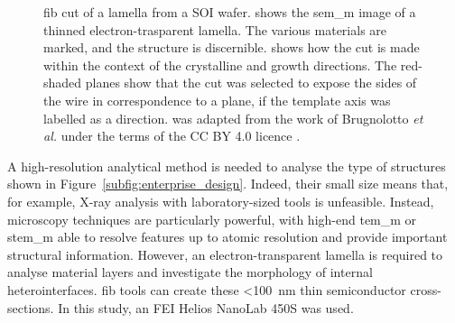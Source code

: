 \begin{figure}
{
    }
    \caption[\acs{fib} cut strategy and result for samples grown on \hkl(0 0 1) \acs{SOI}.]{\acs{fib} cut of a lamella from a  \acs{SOI} wafer.  shows the \acs{sem_m} image of a thinned electron-trasparent lamella. The various materials are marked, and the structure is discernible.  shows how the cut is made within the context of the crystalline and growth directions. The red-shaded planes show that the cut was selected to expose the sides of the wire in correspondence to a  plane, if the template axis was labelled as a  direction.  was adapted from the work of Brugnolotto \textit{et al.} \cite{Brugnolotto2023} under the terms of the CC BY 4.0 licence \cite{CCBY40}.}
    \label{fig:001_FIB}
\end{figure}

A high-resolution analytical method is needed to analyse the type of structures shown in Figure~\ref{subfig:enterprise_design}. Indeed, their small size means that, for example, X-ray analysis with laboratory-sized tools is unfeasible. Instead, microscopy techniques are particularly powerful, with high-end \acf{tem_m} or \acf{stem_m} able to resolve features up to atomic resolution and provide important structural information. However, an electron-transparent lamella is required to analyse material layers and investigate the morphology of internal heterointerfaces. \Acf{fib} tools can create these <\qty{100}{\nano\metre} thin semiconductor cross-sections. In this study, an FEI Helios NanoLab 450S was used.

